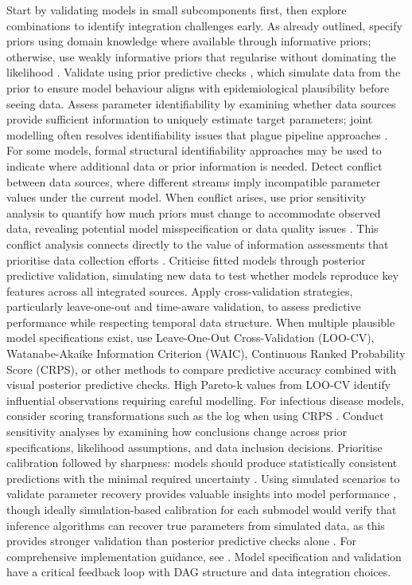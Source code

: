 \documentclass{article}
\begin{document}
Start by validating models in small subcomponents first, then explore combinations to identify integration challenges early.
As already outlined, specify priors using domain knowledge where available through informative priors; otherwise, use weakly informative priors that regularise without dominating the likelihood \citep{gelman2020bayesian}.
Validate using prior predictive checks \citep{yang2025detecting}, which simulate data from the prior to ensure model behaviour aligns with epidemiological plausibility before seeing data.
Assess parameter identifiability by examining whether data sources provide sufficient information to uniquely estimate target parameters; joint modelling often resolves identifiability issues that plague pipeline approaches \citep{lison2024generative, russell2024combined}.
For some models, formal structural identifiability approaches may be used to indicate where additional data or prior information is needed.
Detect conflict between data sources, where different streams imply incompatible parameter values under the current model.
When conflict arises, use prior sensitivity analysis to quantify how much priors must change to accommodate observed data, revealing potential model misspecification or data quality issues \citep{roos2015sensitivity,nott2021approximation,kallioinen2021detecting}.
This conflict analysis connects directly to the value of information assessments that prioritise data collection efforts \citep{jackson2019value}.
Criticise fitted models through posterior predictive validation, simulating new data to test whether models reproduce key features across all integrated sources.
Apply cross-validation strategies, particularly leave-one-out and time-aware validation, to assess predictive performance while respecting temporal data structure.
When multiple plausible model specifications exist, use Leave-One-Out Cross-Validation (LOO-CV), Watanabe-Akaike Information Criterion (WAIC), Continuous Ranked Probability Score (CRPS), or other methods to compare predictive accuracy \citep{vehtari2017practical,yao2018using,bosse2023scoring} combined with visual posterior predictive checks.
High Pareto-k values from LOO-CV identify influential observations requiring careful modelling.
For infectious disease models, consider scoring transformations such as the log when using CRPS \citep{bosse2023scoring}.
Conduct sensitivity analyses by examining how conclusions change across prior specifications, likelihood assumptions, and data inclusion decisions.
Prioritise calibration followed by sharpness: models should produce statistically consistent predictions with the minimal required uncertainty \citep{gneiting2007strictly}.
Using simulated scenarios to validate parameter recovery provides valuable insights into model performance \citep{bouman2024bayesian}, though ideally simulation-based calibration for each submodel would verify that inference algorithms can recover true parameters from simulated data, as this provides stronger validation than posterior predictive checks alone \citep{talts2018validating}.
For comprehensive implementation guidance, see \citep{gelman2020bayesian}.
Model specification and validation have a critical feedback loop with DAG structure and data integration choices.
\end{document}
